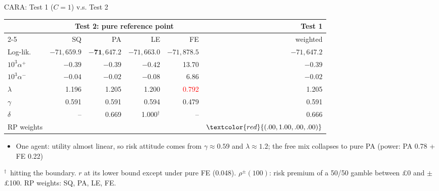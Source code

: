 \documentclass[aspectratio=169,11pt]{beamer}
\newcommand{\ap}{\alpha^{+}}
\newcommand{\am}{\alpha^{-}}
\newcommand{\bd}{\ensuremath{^{\dagger}}}
\newcommand{\tabnote}[1]{\par\vfill{\scriptsize\color{muted}#1\par}}
\newcommand{\tight}{\setlength{\itemsep}{3pt}}
\newcommand{\rp}[1]{\rho^{#1}}
\begin{document}
\begin{frame}{CARA: Test 1 ($C=1$) v.s. Test 2}
{\centering\footnotesize
\begin{tabular}{l rrrr r}
\toprule
& \multicolumn{4}{c}{Test 2: pure reference point} & Test 1\\
\cmidrule(lr){2-5}
& SQ & PA & LE & FE & weighted\\
\midrule
Log-lik. & $-71{,}659.9$ & $\mathbf{-71{,}647.2}$ & $-71{,}663.0$ & $-71{,}878.5$ & $-71{,}647.2$\\
$10^{3}\ap$ & $-0.39$ & $-0.39$ & $-0.42$ & 13.70 & $-0.39$\\
$10^{3}\am$ & $-0.04$ & $-0.02$ & $-0.08$ & 6.86 & $-0.02$\\
$\lambda$ & 1.196 & 1.205 & 1.200 & \textcolor{red}{0.792} & 1.205\\
$\gamma$ & 0.591 & 0.591 & 0.594 & 0.479 & 0.591\\
$\delta$ & -- & 0.669 & 1.000\bd & -- & 0.666\\

RP weights & & & & & $\textcolor{red}{(.00,1.00,.00,.00)}$\\
\bottomrule
\end{tabular}\par}
\begin{itemize}\small\tight
  \item One agent: utility almost linear, so risk attitude comes from $\gamma\approx 0.59$ and $\lambda\approx 1.2$; the free mix collapses to pure PA (power: PA 0.78 + FE 0.22)
\end{itemize}
\tabnote{\bd\ hitting the boundary. $r$ at its lower bound except under pure FE (0.048). $\rp{\pm}(100)$: risk premium of a 50/50 gamble between \pounds 0 and $\pm$\pounds 100. RP weights: SQ, PA, LE, FE.}
\end{frame}
\end{document}
